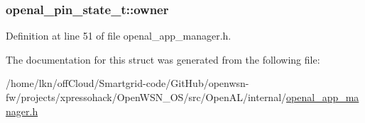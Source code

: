 \subsubsection[{\texorpdfstring{owner}{owner}}]{ openal\+\_\+pin\+\_\+state\+\_\+t\+::owner}\hypertarget{structopenal__pin__state__t_a76e4815d53099f9f30deb212044ba3d8}{}\label{structopenal__pin__state__t_a76e4815d53099f9f30deb212044ba3d8}


Definition at line 51 of file openal\+\_\+app\+\_\+manager.\+h.



The documentation for this struct was generated from the following file\+:\begin{DoxyCompactItemize}
\item 
/home/lkn/off\+Cloud/\+Smartgrid-\/code/\+Git\+Hub/openwsn-\/fw/projects/xpressohack/\+Open\+W\+S\+N\+\_\+\+O\+S/src/\+Open\+A\+L/internal/\hyperlink{openal__app__manager_8h}{openal\+\_\+app\+\_\+manager.\+h}\end{DoxyCompactItemize}

